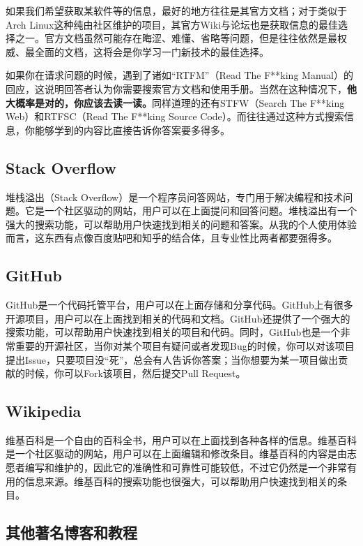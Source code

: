 \documentclass[../main.tex]{subfiles}
\begin{document}
如果我们希望获取某软件等的信息，最好的地方往往是其官方文档；对于类似于Arch Linux这种纯由社区维护的项目，其官方Wiki与论坛也是获取信息的最佳选择之一。官方文档虽然可能存在晦涩、难懂、省略等问题，但是往往依然是最权威、最全面的文档，这将会是你学习一门新技术的最佳选择。

如果你在请求问题的时候，遇到了诸如“RTFM”（Read The F**king Manual）的回应，这说明回答者认为你需要搜索官方文档和使用手册。当然在这种情况下，\textbf{他大概率是对的，你应该去读一读。}同样道理的还有STFW（Search The F**king Web）和RTFSC（Read The F**king Source Code）。而往往通过这种方式搜索信息，你能够学到的内容比直接告诉你答案要多得多。

\subsection{Stack Overflow}

堆栈溢出（Stack Overflow）是一个程序员问答网站，专门用于解决编程和技术问题。它是一个社区驱动的网站，用户可以在上面提问和回答问题。堆栈溢出有一个强大的搜索功能，可以帮助用户快速找到相关的问题和答案。从我的个人使用体验而言，这东西有点像百度贴吧和知乎的结合体，且专业性比两者都要强得多。

\subsection{GitHub}

GitHub是一个代码托管平台，用户可以在上面存储和分享代码。GitHub上有很多开源项目，用户可以在上面找到相关的代码和文档。GitHub还提供了一个强大的搜索功能，可以帮助用户快速找到相关的项目和代码。同时，GitHub也是一个非常重要的开源社区，当你对某个项目有疑问或者发现Bug的时候，你可以对该项目提出Issue，只要项目没“死”，总会有人告诉你答案；当你想要为某一项目做出贡献的时候，你可以Fork该项目，然后提交Pull Request。

\subsection{Wikipedia}

维基百科是一个自由的百科全书，用户可以在上面找到各种各样的信息。维基百科是一个社区驱动的网站，用户可以在上面编辑和修改条目。维基百科的内容是由志愿者编写和维护的，因此它的准确性和可靠性可能较低，不过它仍然是一个非常有用的信息来源。维基百科的搜索功能也很强大，可以帮助用户快速找到相关的条目。

\subsection{其他著名博客和教程}
\end{document}
